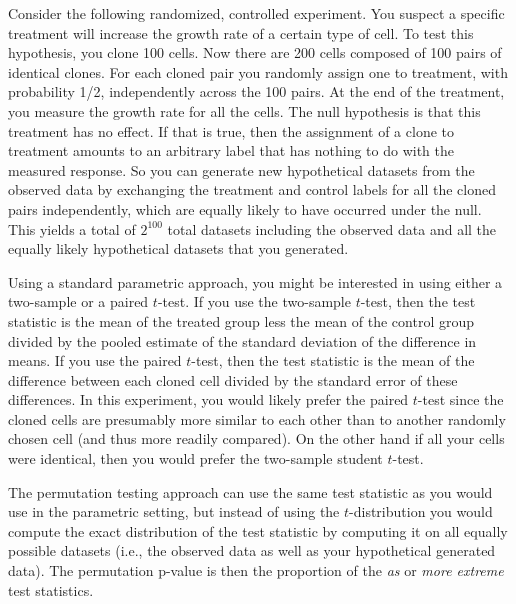 \begin{example}[label=exa:cont] Consider the following randomized, controlled
experiment.  You suspect a specific treatment will increase the growth rate of
a certain type of cell.  To test this hypothesis, you clone 100 cells. Now
there are 200 cells composed of 100 pairs of identical clones. For each cloned
pair you randomly assign one to treatment, with probability 1/2, independently
across the 100 pairs.  At the end of the treatment, you measure the growth rate
for all the cells.  The null hypothesis is that this treatment has no effect.
If that is true, then the assignment of a clone to treatment amounts to an
arbitrary label that has nothing to do with the measured response.  So you can
generate new hypothetical datasets from the observed data by exchanging the
treatment and control labels for all the cloned pairs independently, which are
equally likely to have occurred under the null.  This yields a total of
$2^{100}$ total datasets including the observed data and all the equally likely
hypothetical datasets that you generated.

Using a standard parametric approach, you might be interested in using either a
two-sample or a paired $t$-test.  If you use the two-sample $t$-test, then the
test statistic is the mean of the treated group less the mean of the control
group divided by the pooled estimate of the standard deviation of the
difference in means.  If you use the paired $t$-test, then the test statistic
is the mean of the difference between each cloned cell divided by the standard
error of these differences.  In this experiment, you would likely prefer the
paired $t$-test since the cloned cells are presumably more similar to each
other than to another randomly chosen cell (and thus more readily compared).
On the other hand if all your cells were identical, then you would prefer the
two-sample student $t$-test.

The permutation testing approach can use the same test statistic as you would
use in the parametric setting, but instead of using the $t$-distribution you
would compute the exact distribution of the test statistic by computing it
on all equally possible datasets (i.e., the observed data as well as your
hypothetical generated data).  The permutation p-value is then the proportion
of the \emph{as} or \emph{more extreme} test statistics.
\end{example}

